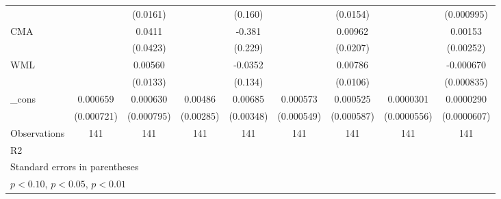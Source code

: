 \begin{table}[htbp]
\begin{tabular}{l*{8}{c}}
                    &                     &    (0.0161)         &                     &     (0.160)         &                     &    (0.0154)         &                     &  (0.000995)         \\
CMA                 &                     &      0.0411         &                     &      -0.381\sym{*}  &                     &     0.00962         &                     &     0.00153         \\
                    &                     &    (0.0423)         &                     &     (0.229)         &                     &    (0.0207)         &                     &   (0.00252)         \\
WML                 &                     &     0.00560         &                     &     -0.0352         &                     &     0.00786         &                     &   -0.000670         \\
                    &                     &    (0.0133)         &                     &     (0.134)         &                     &    (0.0106)         &                     &  (0.000835)         \\
\_cons              &    0.000659         &    0.000630         &     0.00486\sym{*}  &     0.00685\sym{*}  &    0.000573         &    0.000525         &   0.0000301         &   0.0000290         \\
                    &  (0.000721)         &  (0.000795)         &   (0.00285)         &   (0.00348)         &  (0.000549)         &  (0.000587)         & (0.0000556)         & (0.0000607)         \\
\hline
Observations        &         141         &         141         &         141         &         141         &         141         &         141         &         141         &         141         \\
R2                  &                     &                     &                     &                     &                     &                     &                     &                     \\
\hline\hline
\multicolumn{9}{l}{\footnotesize Standard errors in parentheses}\\
\multicolumn{9}{l}{\footnotesize \sym{*} \(p<0.10\), \sym{**} \(p<0.05\), \sym{***} \(p<0.01\)}\\
\end{tabular}
\end{table}
